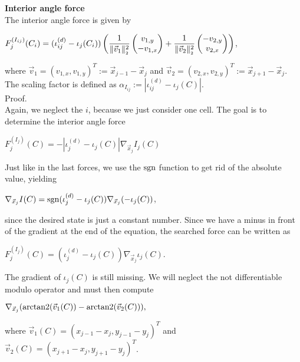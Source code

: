 \begin{proposition} \textbf{Interior angle force} \\
	The interior angle force is given by
	\begin{center}
		$F^{(I_{ij})}_j(C_i) = (\iota_{ij}^{(d)} - \iota_j(C_i))\left(
		\dfrac{1}{\norm[\vec{v}_1]^2} \begin{pmatrix}
			v_{1,y} \\-v_{1,x}
		\end{pmatrix}
		+ \dfrac{1}{\norm[\vec{v}_2]^2}\begin{pmatrix} -v_{2,y} \\ v_{2,x} \end{pmatrix}\right)
		$,
	\end{center}
	where $\vec{v}_1 = (v_{1,x}, v_{1,y})^T :=\vec{x}_{j-1} - \vec{x}_{j}$ and  $\vec{v}_2 = (v_{2,x}, v_{2,y})^T := \vec{x}_{j+1} - \vec{x}_{j}$. \\
	The scaling factor is defined as $\alpha_{I_{ij}} := | \iota_{ij}^{(d)} - \iota_j(C) |$. \\
	Proof. \\
	Again, we neglect the $i$, because we just consider one cell. 
	The goal is to determine the interior angle force
	\begin{center}
		$
		F^{(I_j)}_j(C) = - |\iota_{j}^{(d)} - \iota_j(C)| \nabla_{\vec{x}_j}I_j(C)
		$
	\end{center}
	Just like in the last forces, we use the $\operatorname{sgn}$ function to get rid of the absolute value, yielding
	\begin{center}
		$
		\nabla_{\vec{x}_j} I(C) = \operatorname{sgn}(\iota_j^{(d)}-\iota_j(C)) \nabla_{\vec{x}_j} (- \iota_j(C))
		$,
	\end{center}
	since the desired state is just a constant number. Since we have a minus in front of the gradient at the end of the equation, the searched force can be written as 
	\begin{center}
		$
		F^{(I_j)}_j(C) = (\iota_{j}^{(d)} - \iota_j(C)) \nabla_{\vec{x}_j}\iota_j(C)
		$.
	\end{center}
	The gradient of $\iota_j(C)$ is still missing. We will neglect the not differentiable modulo operator and must then compute
	\begin{center}
		$
		\nabla_{\vec{x}_j} (\operatorname{arctan2}(\vec{v}_1(C)) - \operatorname{arctan2}(\vec{v}_2(C))), 
		$
	\end{center}
	where $\vec{v}_1(C) = (x_{j-1} - x_{j} , y_{j-1} - y_{j})^T$ and $\vec{v}_2(C) = (x_{j+1} - x_{j} , y_{j+1} - y_{j})^T$. \\

\end{proposition}
